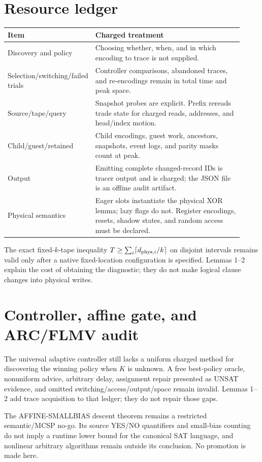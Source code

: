 \documentclass[11pt]{article}
\begin{document}
\section{Resource ledger}
\begin{center}
\begin{tabular}{p{0.27\linewidth}p{0.65\linewidth}}
\toprule
Item & Charged treatment\\
\midrule
Discovery and policy & Choosing whether, when, and in which encoding to trace is not supplied.\\
Selection/switching/failed trials & Controller comparisons, abandoned traces, and re-encodings remain in total time and peak space.\\
Source/tape/query & Snapshot probes are explicit.  Prefix rereads trade state for charged reads, addresses, and head/index motion.\\
Child/guest/retained & Child encodings, guest work, ancestors, snapshots, event logs, and parity masks count at peak.\\
Output & Emitting complete changed-record IDs is tracer output and is charged; the JSON file is an offline audit artifact.\\
Physical semantics & Eager slots instantiate the physical XOR lemma; lazy flags do not.  Register encodings, resets, shadow states, and random access must be declared.\\
\bottomrule
\end{tabular}
\end{center}

The exact fixed-$k$-tape inequality $T\geq\sum_i\lceil d_{{\rm phys},i}/k\rceil$ on disjoint intervals remains valid only after a native fixed-location configuration is specified.  Lemmas 1--2 explain the cost of obtaining the diagnostic; they do not make logical clause changes into physical writes.

\section{Controller, affine gate, and ARC/FLMV audit}
The universal adaptive controller still lacks a uniform charged method for discovering the winning policy when $K$ is unknown.  A free best-policy oracle, nonuniform advice, arbitrary delay, assignment repair presented as UNSAT evidence, and omitted switching/access/output/space remain invalid.  Lemmas 1--2 add trace acquisition to that ledger; they do not repair those gaps.

The AFFINE-SMALLBIAS descent theorem remains a restricted semantic/MCSP no-go.  Its source YES/NO quantifiers and small-bias counting do not imply a runtime lower bound for the canonical SAT language, and nonlinear arbitrary algorithms remain outside its conclusion.  No promotion is made here.
\end{document}
